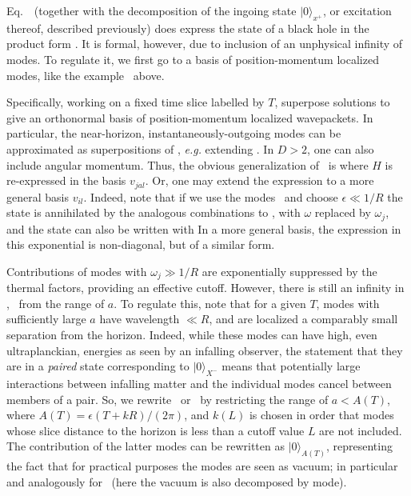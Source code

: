 Eq.~\stateexp\ (together with the decomposition of the ingoing state $|0\rangle_{x^+}$, or excitation thereof, described previously) does express the state of a black hole in the product form \hprod.  It is formal, however, due to inclusion of an unphysical infinity of modes.  To regulate it, we first go to a basis of position-momentum localized modes, like the example \vki\ above.

Specifically, working on a fixed time slice labelled by $T$, superpose solutions  to give an orthonormal basis of position-momentum localized wavepackets.  In particular, the near-horizon, instantaneously-outgoing modes can be approximated as superpositions of \cplxmod, {\it e.g.} extending \vki.  In $D>2$, one can also include angular momentum.  Thus, the obvious generalization of \stateexp\ is
%
\eqn{}
%
where $H$ is re-expressed in the basis $v_{jal}$.  Or, one may extend the expression to a more general basis $v_{il}$. Indeed, note that if we use the modes \vki\ and choose $\epsilon\ll 1/R$ the state is annihilated by the analogous combinations to \statecond, with $\omega$ replaced by $\omega_j$, and the state can also be written
%
\eqn{}
%
with
%
\eqn{}
%
In a more general basis, the expression in this exponential is non-diagonal, but of a similar form.

Contributions of modes with $\omega_j\gg 1/R$ are exponentially suppressed by the thermal factors, providing an effective cutoff.  
However, there is still an infinity in \statepack, \sqopvers\ from the range of $a$.  To regulate this, note that for a given $T$, modes with sufficiently large $a$ have wavelength $\ll R$, and are localized a comparably small separation from the horizon.  Indeed, while these modes can have high, even ultraplanckian, energies as seen by an infalling observer, the statement that they are in a {\it paired} state corresponding to $|0\rangle_{X^-}$  means that potentially large interactions between infalling matter and the individual modes cancel between members of a pair. So, we rewrite \statepack\ or \sqopvers\ by restricting the range of $a<A(T)$, where $A(T) =  \epsilon(T+kR)/(2\pi)$, and $k(L)$ is chosen in order that modes whose slice distance to the horizon is less than a cutoff value $L$ are not included. 
The contribution of the latter modes can be rewritten as $|0\rangle_{A(T)}$, representing the fact that for practical purposes the modes are seen as vacuum; in particular
%
\eqn{}
%
and analogously for \statepack\ (here the vacuum is also decomposed by mode).

